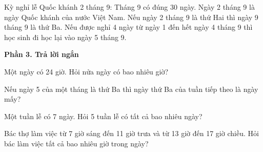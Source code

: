 \begin{ex} %
Kỳ nghỉ lễ Quốc khánh 2 tháng 9:
\choiceTF
{\True Tháng 9 có đúng 30 ngày.}
{\True Ngày 2 tháng 9 là ngày Quốc khánh của nước Việt Nam.}
{Nếu ngày 2 tháng 9 là thứ Hai thì ngày 9 tháng 9 là thứ Ba.}
{\True Nếu được nghỉ 4 ngày từ ngày 1 đến hết ngày 4 tháng 9 thì học sinh đi học lại vào ngày 5 tháng 9.}
\end{ex}

\textbf{Phần 3. Trả lời ngắn}

\begin{ex} %
Một ngày có 24 giờ. Hỏi nửa ngày có bao nhiêu giờ?
\end{ex}

\begin{ex} %
Nếu ngày 5 của một tháng là thứ Ba thì ngày thứ Ba của tuần tiếp theo là ngày mấy?
\end{ex}

\begin{ex} %
Một tuần lễ có 7 ngày. Hỏi 5 tuần lễ có tất cả bao nhiêu ngày?
\end{ex}

\begin{ex} %
Bác thợ làm việc từ 7 giờ sáng đến 11 giờ trưa và từ 13 giờ đến 17 giờ chiều. Hỏi bác làm việc tất cả bao nhiêu giờ trong ngày?
\end{ex}

